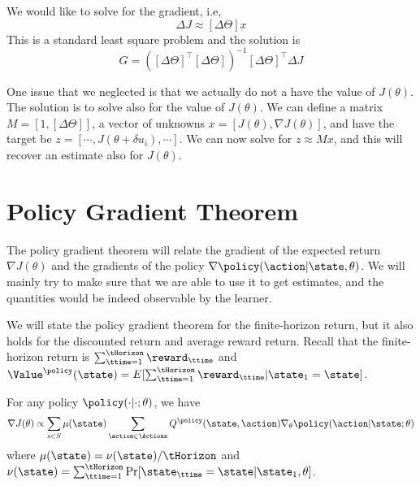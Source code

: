 We would like to solve for the gradient, i.e,
\[
\Delta J\approx [\Delta \Theta]x
\]
This is a standard least square problem and the solution is
\[
G=([\Delta \Theta]^\top [\Delta \Theta])^{-1} [\Delta\Theta]^\top
\Delta J
\]

One issue that we neglected is that we actually do not a have the
value of $J(\theta)$. The solution is to solve also for the value of
$J(\theta)$.
%
We can define a matrix $M=[1, [\Delta\Theta]]$, a vector of unknowns
$x=[J(\theta), \nabla J(\theta)]$, and have the target be
$z=[\cdots, J(\theta+\delta u_i),\cdots]$. We can now solve for
$z\approx Mx$, and this will recover an estimate also for
$J(\theta)$.


\section{Policy Gradient Theorem}

The policy gradient theorem will relate the gradient of the expected
return $\nabla J(\theta)$ and the gradients of the policy $\nabla
\policy(\action|\state,\theta)$. We will mainly try to make sure
that we are able to use it to get estimates, and the quantities
would be indeed observable by the learner.

We will state the policy gradient theorem for the finite-horizon
return, but it also holds for the discounted return and average
reward return. Recall that the finite-horizon return is
$\sum_{\ttime=1}^\tHorizon \reward_\ttime$ and
$\Value^\policy(\state)=E[\sum_{\ttime=1}^\tHorizon
\reward_\ttime|\state_1=\state]$.

\begin{theorem}
\label{thm:policy-gradient} For any policy
$\policy(\cdot|\cdot;\theta)$, we have
\[
\nabla J(\theta)\propto \sum_{s\in S} \mu(\state) \sum_{\action\in
\Actions} Q^\policy (\state,\action)\nabla_\theta
\policy(\action|\state;\theta)
\]
where $\mu(\state)=\nu(\state)/\tHorizon$ and
$\nu(\state)=\sum_{\ttime=1}^\tHorizon\Pr[\state_\ttime=\state|\state_1,\theta]$.
\end{theorem}

